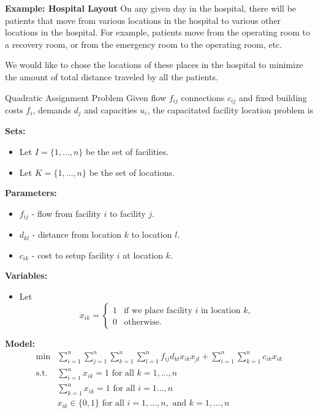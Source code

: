 {\textbf{Example:  Hospital Layout}
On any given day in the hospital, there will be patients that move from various locations in the hospital to various other locations in the hospital.  For example, patients move from the operating room to a recovery room, or from the emergency room to the operating room, etc.

We would like to chose the locations of these places in the hospital to minimize the amount of total distance traveled by all the patients. 






\begin{general}{Quadratic Assignment Problem}{\npcomplete}
Given flow $f_{ij}$  connections $c_{ij}$ and fixed building costs $f_i$, demands $d_j$ and capacities $u_i$, the capacitated facility location problem is 

\noindent \textbf{Sets:}
\begin{itemize}
\item Let $I = \{1,\dots, n\}$ be the set of facilities.
\item Let $K = \{1, \dots, n\}$ be the set of locations.
\end{itemize}

\noindent \textbf{Parameters:}
\begin{itemize}
\item $f_{ij}$ - flow from facility $i$ to facility $j$.
\item $d_{kl}$ - distance from location $k$ to location $l$.
\item $c_{ik}$ - cost to setup facility $i$ at location $k$.
\end{itemize}

\noindent \textbf{Variables:}
\begin{itemize}
\item Let 
\begin{equation*}
x_{ik} = \begin{cases}
1 & \text{if we place facility $i$ in location $k$,}\\
0 & \text{otherwise.}
\end{cases}
\end{equation*}
\end{itemize}

\noindent  \textbf{Model:}
\begin{align}
\min & \displaystyle\sum_{i=1}^n\sum_{j=1}^n \sum_{k=1}^n \sum_{l = 1}^n f_{ij}d_{kl}x_{ik}x_{jl} + \sum_{i=1}^n \sum_{k = 1}^n c_{ik} x_{ik} \tag{total cost}\\
\text{s.t.} & \displaystyle\sum_{i=1}^n x_{ik}=1 \text{ for all }k=1,\dots,n \tag{assign facility to location $k$}\\
& \displaystyle \sum_{k=1}^n x_{ik}=1 \text{ for all }i=1\dots,n \tag{assign one location to facility $i$}\\
&x_{ik}\in\{0,1\}\text{ for all } i=1,\dots,n, \text{ and } k = 1, \dots, n \tag{binary decisions}
\end{align}
\end{general}

}
